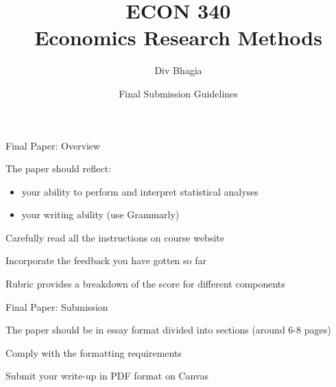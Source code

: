 \documentclass{./../Lectures/div_teaching_slides}
\begin{document}
\title{ECON 340 \\ Economics Research Methods}
\author{Div Bhagia}
\date{Final Submission Guidelines}

\begin{frame}
\maketitle
\end{frame}



\begin{frame}{Final Paper: Overview}
\begin{witemize}
\item The paper should reflect:\\
  \begin{itemize}
  \item your ability to perform and interpret statistical analyses
  \item your writing ability (use Grammarly)
\end{itemize}
\item Carefully read all the instructions on course website
\item Incorporate the feedback you have gotten so far
\item Rubric provides a breakdown of the score for different components
\end{witemize}
\end{frame}

\begin{frame}{Final Paper: Submission}
\begin{witemize}
\item The paper should be in essay format divided into sections (around 6-8 pages)
\item Comply with the formatting requirements
\item Submit your write-up in PDF format on Canvas
\end{witemize} 
\end{frame}
\end{document}
